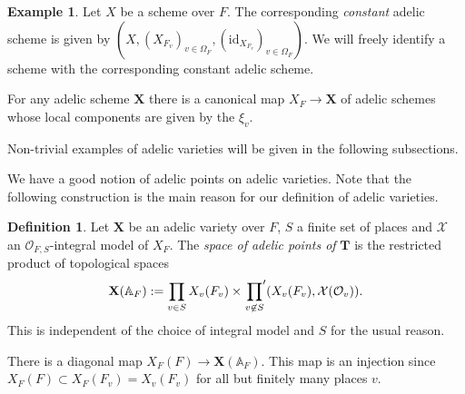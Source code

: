 \documentclass[a4paper,11pt,reqno]{amsart}
\newcommand{\A}{\mathbb{A}}
\theoremstyle{definition}
\newtheorem{definition}[theorem]{Definition}
\newtheorem{example}[theorem]{Example}
\begin{document}
\begin{example}
	Let $X$ be a scheme over $F$. The corresponding \emph{constant} adelic scheme is given by $(X, (X_{F_v})_{v \in \Omega_F}, (\text{id}_{X_{F_v}})_{v \in \Omega_F})$. We will freely identify a scheme with the corresponding constant adelic scheme. 
	
	For any adelic scheme $\mathbf{X}$ there is a canonical map $X_F \to \mathbf{X}$ of adelic schemes whose local components are given by the $\xi_v$.
\end{example}
Non-trivial examples of adelic varieties will be given in the following subsections.

We have a good notion of adelic points on adelic varieties. Note that the following construction is the main reason for our definition of adelic varieties.
\begin{definition}
	Let $\mathbf{X}$ be an adelic variety over $F$, $S$ a finite set of places and $\mathcal{X}$ an $\mathcal{O}_{F, S}$-integral model of $X_F$. The \emph{space of adelic points of} $\mathbf{T}$ is the restricted product of topological spaces
	\begin{equation*}
		\mathbf{X}(\A_F) := \prod_{v \in S} X_v(F_v) \times \sideset{}{'}\prod_{v \not \in S} (X_v(F_v), \mathcal{X}(\mathcal{O}_v)) .
	\end{equation*}
	This is independent of the choice of integral model and $S$ for the usual reason.
	
	There is a diagonal map $X_F(F) \to \mathbf{X}(\A_F)$. This map is an injection since $X_F(F) \subset X_F(F_v) = X_v(F_v)$ for all but finitely many places $v$.
\end{definition}
\end{document}
